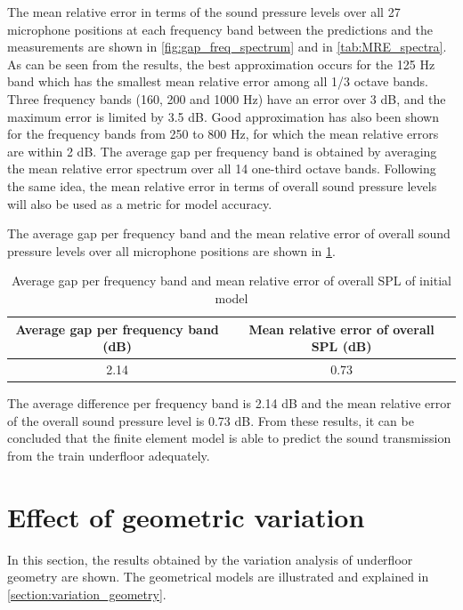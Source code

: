 The mean relative error in terms of the sound pressure levels over all 27 microphone positions at each frequency band between the predictions and the measurements are shown in \cref{fig:gap_freq_spectrum} and in \cref{tab:MRE_spectra}. As can be seen from the results, the best approximation occurs for the 125 Hz band which has the smallest mean relative error among all 1/3 octave bands. Three frequency bands (160, 200 and 1000 Hz) have an error over 3 dB, and the maximum error is limited by 3.5 dB. Good approximation has also been shown for the frequency bands from 250 to 800 Hz, for which the mean relative errors are within 2 dB. The average gap per frequency band is obtained by averaging the mean relative error spectrum over all 14 one-third octave bands. Following the same idea, the mean relative error in terms of overall sound pressure levels will also be used as a metric for model accuracy.

The average gap per frequency band and the mean relative error of overall sound pressure levels over all microphone positions are shown in \cref{tab:average_gap}.
\begin{table}%
	\centering
	\caption{Average gap per frequency band and mean relative error of overall SPL of initial model}
	\begin{tabular}{c|c}
		Average gap per  frequency band (dB) & Mean relative error of overall SPL (dB) \\ \hline
		2.14 & 0.73
	\end{tabular}
	\label{tab:average_gap}
\end{table}
The average difference per frequency band is 2.14 dB and the mean relative error of the overall sound pressure level is 0.73 dB. From these results, it can be concluded that the finite element model is able to predict the sound transmission from the train underfloor adequately.


\section{Effect of geometric variation}

In this section, the results obtained by the variation analysis of underfloor geometry are shown. The geometrical models are illustrated and explained in \cref{section:variation_geometry}.

